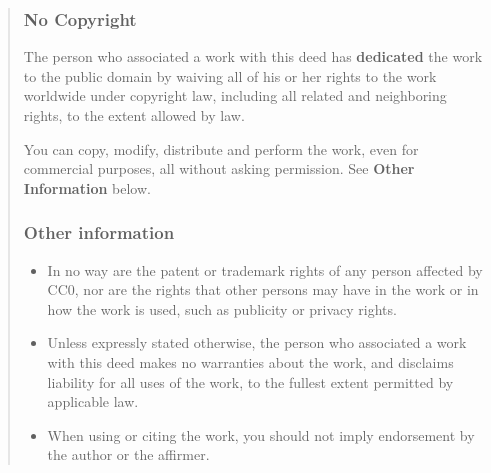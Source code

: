 \begin{flushleft}
    \begin{quote}
        \subsubsection*{No Copyright}

        The person who associated a work with this deed has \textbf{dedicated} the work to the public domain by waiving all of his or her rights to the work worldwide under copyright law, including all related and neighboring rights, to the extent allowed by law.

        You can copy, modify, distribute and perform the work, even for commercial purposes, all without asking permission. See \textbf{Other Information} below.

        \subsubsection*{Other information}

        \begin{itemize}
            \item In no way are the patent or trademark rights of any person affected by CC0, nor are the rights that other persons may have in the work or in how the work is used, such as publicity or privacy rights.
            \item Unless expressly stated otherwise, the person who associated a work with this deed makes no warranties about the work, and disclaims liability for all uses of the work, to the fullest extent permitted by applicable law.
            \item When using or citing the work, you should not imply endorsement by the author or the affirmer.
        \end{itemize}
    \end{quote}
\end{flushleft}
